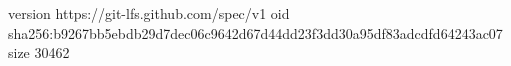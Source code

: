 version https://git-lfs.github.com/spec/v1
oid sha256:b9267bb5ebdb29d7dec06c9642d67d44dd23f3dd30a95df83adcdfd64243ac07
size 30462
